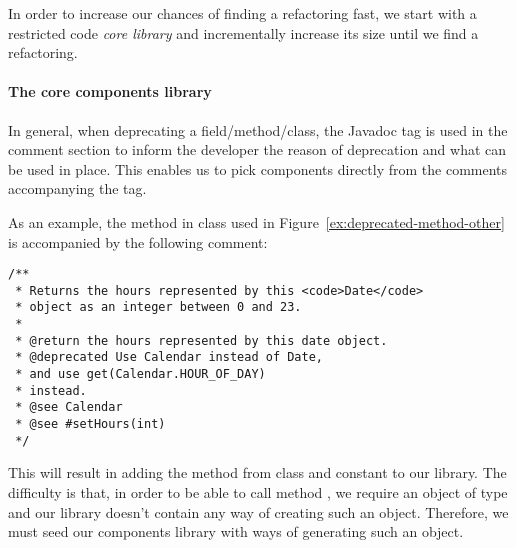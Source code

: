 \documentclass[runningheads,a4paper]{llncs}
\begin{document}
In order to increase our chances of finding a refactoring fast, we start with a restricted code  {\em core library} and incrementally increase its size
until we find a refactoring.


\paragraph{The core components library}
In general, when deprecating a field/method/class, the
 Javadoc tag is used in the comment section to
inform the developer the reason of deprecation and what can be used in
place. This enables us to pick components directly from the comments accompanying the
 tag.


As an example, the  method in class  used in Figure~\ref{ex:deprecated-method-other} is accompanied by the following comment:

\begin{lstlisting}[mathescape=true,showstringspaces=false]
/**
 * Returns the hours represented by this <code>Date</code>
 * object as an integer between 0 and 23.
 *
 * @return the hours represented by this date object.
 * @deprecated Use Calendar instead of Date,
 * and use get(Calendar.HOUR_OF_DAY)
 * instead.
 * @see Calendar
 * @see #setHours(int)
 */  
\end{lstlisting}


This will result in adding the method  from class
 and constant  to our library.
The difficulty is that, in order to be able to call method , we require an object of
type  and our library doesn't contain any way of creating such an object.
Therefore, we must seed our components library with ways of generating such an object.
\end{document}
